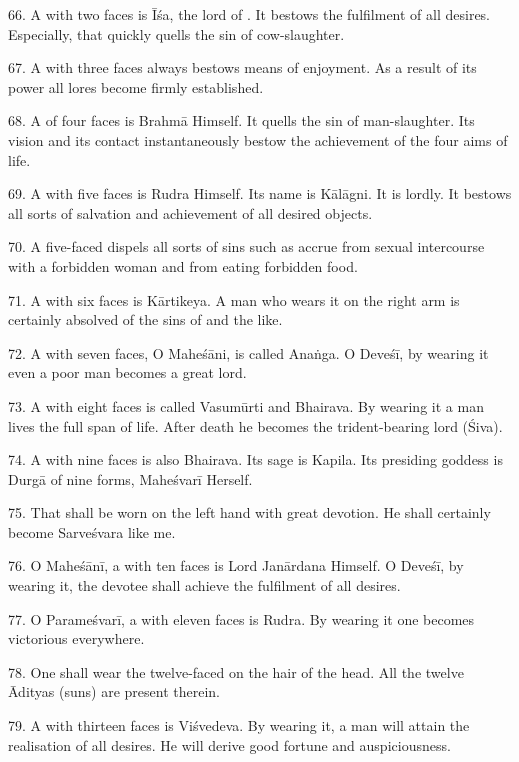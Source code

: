 66. A  with two faces is Īśa, the lord of . It bestows
the fulfilment of all desires. Especially, that  quickly quells
the sin of cow-slaughter.

67. A  with three faces always bestows means of enjoyment. As a
result of its power all lores become firmly established.

68. A  of four faces is Brahmā Himself. It quells the sin of
man-slaughter. Its vision and its contact instantaneously bestow the achievement
of the four aims of life.

69. A  with five faces is Rudra Himself. Its name is Kālāgni. It is
lordly. It bestows all sorts of salvation and achievement of all desired objects.

70. A five-faced  dispels all sorts of sins such as accrue from
sexual intercourse with a forbidden woman and from eating forbidden food.

71. A  with six faces is Kārtikeya. A man who wears it on the right
arm is certainly absolved of the sins of  and the like.

72. A  with seven faces, O Maheśāni, is called Anaṅga. O Deveśī, by
wearing it even a poor man becomes a great lord.

73. A  with eight faces is called Vasumūrti and Bhairava. By
wearing it a man lives the full span of life. After death he becomes
the trident-bearing lord (Śiva).

74. A  with nine faces is also Bhairava. Its sage is Kapila. Its
presiding goddess is Durgā of nine forms, Maheśvarī Herself.

75. That  shall be worn on the left hand with great devotion. He
shall certainly become Sarveśvara like me.

76. O Maheśānī, a  with ten faces is Lord Janārdana Himself.
O Deveśī, by wearing it, the devotee shall achieve the fulfilment of all desires.

77. O Parameśvarī, a  with eleven faces is Rudra. By wearing it one
becomes victorious everywhere.

78. One shall wear the twelve-faced  on the hair of the head. All
the twelve Ādityas (suns) are present therein.

79. A  with thirteen faces is Viśvedeva. By wearing it, a man will
attain the realisation of all desires. He will derive good fortune and
auspiciousness.

